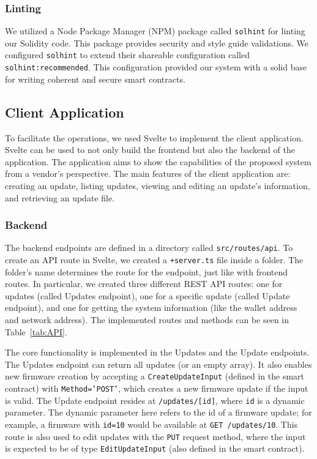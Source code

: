 \documentclass[conference]{IEEEtran}
\begin{document}
\subsubsection{Linting}

We utilized a Node Package Manager (NPM) package called \texttt{solhint} for linting our Solidity code. This package provides security and style guide validations. We configured \texttt{solhint} to extend their shareable configuration called \texttt{solhint:recommended}. This configuration provided our system with a solid base for writing coherent and secure smart contracts.


\subsection{Client Application}
To facilitate the operations, we used Svelte to implement the client application. Svelte can be used to not only build the frontend but also the backend of the application. The application aims to show the capabilities of the proposed system from a vendor's perspective. The main features of the client application are: creating an update, listing updates, viewing and editing an update's information, and retrieving an update file.

\subsubsection{Backend}

The backend endpoints are defined in a directory called \texttt{src/routes/api}. To create an API route in Svelte, we created a \texttt{+server.ts} file inside a folder. The folder's name determines the route for the endpoint, just like with frontend routes. In particular, we created three different REST API routes: one for updates (called Updates endpoint), one for a specific update (called Update endpoint), and one for getting the system information (like the wallet address and network address). The implemented routes and methods can be seen in Table~\ref{tab:API}.


The core functionality is implemented in the Updates and the Update endpoints. The Updates endpoint can return all updates (or an empty array). It also enables new firmware creation by accepting a \texttt{CreateUpdateInput} (defined in the smart contract) with \texttt{Method='POST'}, which creates a new firmware update if the input is valid. The Update endpoint resides at \texttt{/updates/[id]}, where \texttt{id} is a dynamic parameter. The dynamic parameter here refers to the id of a firmware update; for example, a firmware with \texttt{id=10} would be available at \texttt{GET /updates/10}. This route is also used to edit updates with the \texttt{PUT} request method, where the input is expected to be of type \texttt{EditUpdateInput} (also defined in the smart contract).
\end{document}
